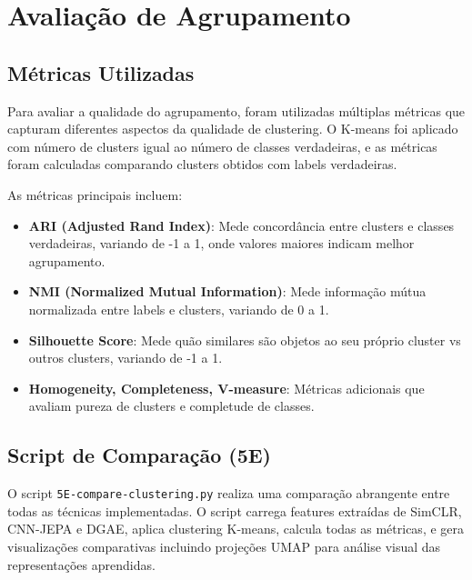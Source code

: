 \section{Avaliação de Agrupamento}

\subsection{Métricas Utilizadas}

Para avaliar a qualidade do agrupamento, foram utilizadas múltiplas métricas que capturam diferentes aspectos da qualidade de clustering. O K-means foi aplicado com número de clusters igual ao número de classes verdadeiras, e as métricas foram calculadas comparando clusters obtidos com labels verdadeiras.

As métricas principais incluem:

\begin{itemize}
    \item \textbf{ARI (Adjusted Rand Index)}: Mede concordância entre clusters e classes verdadeiras, variando de -1 a 1, onde valores maiores indicam melhor agrupamento.
    \item \textbf{NMI (Normalized Mutual Information)}: Mede informação mútua normalizada entre labels e clusters, variando de 0 a 1.
    \item \textbf{Silhouette Score}: Mede quão similares são objetos ao seu próprio cluster vs outros clusters, variando de -1 a 1.
    \item \textbf{Homogeneity, Completeness, V-measure}: Métricas adicionais que avaliam pureza de clusters e completude de classes.
\end{itemize}

\subsection{Script de Comparação (5E)}

O script \texttt{5E-compare-clustering.py} realiza uma comparação abrangente entre todas as técnicas implementadas. O script carrega features extraídas de SimCLR, CNN-JEPA e DGAE, aplica clustering K-means, calcula todas as métricas, e gera visualizações comparativas incluindo projeções UMAP para análise visual das representações aprendidas.
